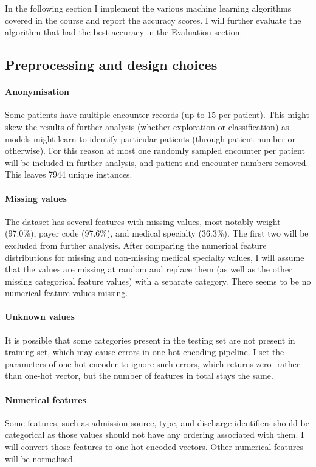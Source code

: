 \documentclass[10pt, twocolumn]{article}
\begin{document}
In the following section I implement the various machine learning algorithms covered in the course and report the accuracy scores. I will further evaluate the algorithm that had the best accuracy in the Evaluation section.

\subsection{Preprocessing and design choices}

\paragraph{Anonymisation} Some patients have multiple encounter records (up to 15 per patient). This might skew the results of further analysis (whether exploration or classification) as models might learn to identify particular patients (through patient number or otherwise). For this reason at most one randomly sampled encounter per patient will be included in further analysis, and patient and encounter numbers removed. This leaves 7944 unique instances.

\paragraph{Missing values} The dataset has several features with missing values, most notably weight (97.0\%), payer code (97.6\%), and medical specialty (36.3\%). The first two will be excluded from further analysis. After comparing the numerical feature distributions for missing and non-missing medical specialty values, I will assume that the values are missing at random and replace them (as well as the other missing categorical feature values) with a separate category. There seems to be no numerical feature values missing.

\paragraph{Unknown values} It is possible that some categories present in the testing set are not present in training set, which may cause errors in one-hot-encoding pipeline. I set the parameters of one-hot encoder to ignore such errors, which returns zero- rather than one-hot vector, but the number of features in total stays the same.

\paragraph{Numerical features} Some features, such as admission source, type, and discharge identifiers should be categorical as those values should not have any ordering associated with them. I will convert those features to one-hot-encoded vectors. Other numerical features will be normalised.
\end{document}
